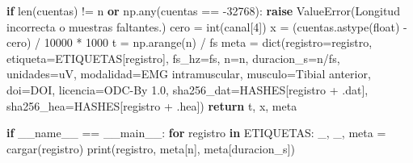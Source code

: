 \documentclass[
  spanish,
  10.5pt,
  a4paper,
  DIV=11,
  numbers=noendperiod]{scrartcl}
\newenvironment{Shaded}{\begin{snugshade}}{\end{snugshade}}
\newcommand{\BuiltInTok}[1]{\textcolor[rgb]{0.00,0.23,0.31}{#1}}
\newcommand{\ControlFlowTok}[1]{\textcolor[rgb]{0.00,0.23,0.31}{\textbf{#1}}}
\newcommand{\DecValTok}[1]{\textcolor[rgb]{0.68,0.00,0.00}{#1}}
\newcommand{\KeywordTok}[1]{\textcolor[rgb]{0.00,0.23,0.31}{\textbf{#1}}}
\newcommand{\NormalTok}[1]{\textcolor[rgb]{0.00,0.23,0.31}{#1}}
\newcommand{\OperatorTok}[1]{\textcolor[rgb]{0.37,0.37,0.37}{#1}}
\newcommand{\PreprocessorTok}[1]{\textcolor[rgb]{0.68,0.00,0.00}{#1}}
\newcommand{\StringTok}[1]{\textcolor[rgb]{0.13,0.47,0.30}{#1}}
\newcommand{\VariableTok}[1]{\textcolor[rgb]{0.07,0.07,0.07}{#1}}
\begin{document}
\begin{Shaded}
\begin{Highlighting}[]
    \ControlFlowTok{if} \BuiltInTok{len}\NormalTok{(cuentas) }\OperatorTok{!=}\NormalTok{ n }\KeywordTok{or}\NormalTok{ np.}\BuiltInTok{any}\NormalTok{(cuentas }\OperatorTok{==} \OperatorTok{{-}}\DecValTok{32768}\NormalTok{):}
        \ControlFlowTok{raise} \PreprocessorTok{ValueError}\NormalTok{(}\StringTok{\textquotesingle{}Longitud incorrecta o muestras faltantes.\textquotesingle{}}\NormalTok{)}
\NormalTok{    cero }\OperatorTok{=} \BuiltInTok{int}\NormalTok{(canal[}\DecValTok{4}\NormalTok{])}
\NormalTok{    x }\OperatorTok{=}\NormalTok{ (cuentas.astype(}\BuiltInTok{float}\NormalTok{) }\OperatorTok{{-}}\NormalTok{ cero) }\OperatorTok{/} \DecValTok{10000} \OperatorTok{*} \DecValTok{1000}
\NormalTok{    t }\OperatorTok{=}\NormalTok{ np.arange(n) }\OperatorTok{/}\NormalTok{ fs}
\NormalTok{    meta }\OperatorTok{=} \BuiltInTok{dict}\NormalTok{(registro}\OperatorTok{=}\NormalTok{registro, etiqueta}\OperatorTok{=}\NormalTok{ETIQUETAS[registro],}
\NormalTok{                fs\_hz}\OperatorTok{=}\NormalTok{fs, n}\OperatorTok{=}\NormalTok{n, duracion\_s}\OperatorTok{=}\NormalTok{n}\OperatorTok{/}\NormalTok{fs, unidades}\OperatorTok{=}\StringTok{\textquotesingle{}uV\textquotesingle{}}\NormalTok{,}
\NormalTok{                modalidad}\OperatorTok{=}\StringTok{\textquotesingle{}EMG intramuscular\textquotesingle{}}\NormalTok{, musculo}\OperatorTok{=}\StringTok{\textquotesingle{}Tibial anterior\textquotesingle{}}\NormalTok{,}
\NormalTok{                doi}\OperatorTok{=}\NormalTok{DOI, licencia}\OperatorTok{=}\StringTok{\textquotesingle{}ODC{-}By 1.0\textquotesingle{}}\NormalTok{,}
\NormalTok{                sha256\_dat}\OperatorTok{=}\NormalTok{HASHES[registro }\OperatorTok{+} \StringTok{\textquotesingle{}.dat\textquotesingle{}}\NormalTok{],}
\NormalTok{                sha256\_hea}\OperatorTok{=}\NormalTok{HASHES[registro }\OperatorTok{+} \StringTok{\textquotesingle{}.hea\textquotesingle{}}\NormalTok{])}
    \ControlFlowTok{return}\NormalTok{ t, x, meta}


\ControlFlowTok{if} \VariableTok{\_\_name\_\_} \OperatorTok{==} \StringTok{\textquotesingle{}\_\_main\_\_\textquotesingle{}}\NormalTok{:}
    \ControlFlowTok{for}\NormalTok{ registro }\KeywordTok{in}\NormalTok{ ETIQUETAS:}
\NormalTok{        \_, \_, meta }\OperatorTok{=}\NormalTok{ cargar(registro)}
        \BuiltInTok{print}\NormalTok{(registro, meta[}\StringTok{\textquotesingle{}n\textquotesingle{}}\NormalTok{], meta[}\StringTok{\textquotesingle{}duracion\_s\textquotesingle{}}\NormalTok{])}
\end{Highlighting}
\end{Shaded}
\end{document}
